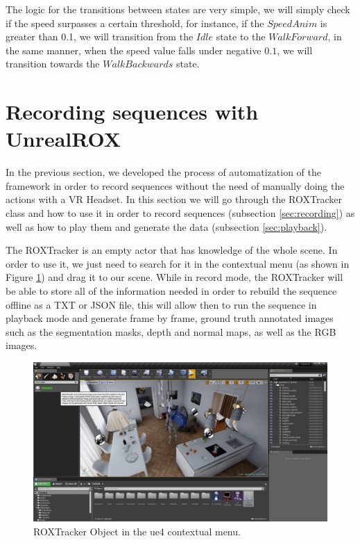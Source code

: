 The logic for the transitions between states are very simple, we will simply check if the speed surpasses a certain threshold, for instance, if the $Speed Anim$ is greater than 0.1, we will transition from the $Idle$ state to the $WalkForward$, in the same manner, when the speed value falls under negative $0.1$, we will transition towards the $WalkBackwards$ state.

\section{Recording sequences with UnrealROX}
In the previous section, we developed the process of automatization of the framework in order to record sequences without the need of manually doing the actions with a VR Headset. In this section we will go through the ROXTracker class and how to use it in order to record sequences (subsection \ref{sec:recording}) as well as how to play them and generate the data (subsection \ref{sec:playback}).

The ROXTracker is an empty actor that has knowledge of the whole scene. In order to use it, we just need to search for it in the contextual menu (as shown in Figure \ref{fig:tracker_object}) and drag it to our scene. While in record mode, the ROXTracker will be able to store all of the information needed in order to rebuild the sequence offline as a TXT or JSON file, this will allow then to run the sequence in playback mode and generate frame by frame, ground truth annotated images such as the segmentation masks, depth and normal maps, as well as the RGB images.

\begin{figure}[h]
	\includegraphics[width=\textwidth]{archivos/tracker_object.png}
	\centering
	\caption{ROXTracker Object in the \gls{ue4} contextual menu.}
	\label{fig:tracker_object}
\end{figure}

